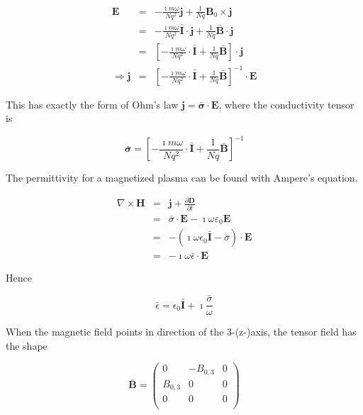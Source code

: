 \documentclass[a4paper,11pt]{thesis}
\begin{document}
\begin{eqnarray}
    \mathbf{E}&=& -\frac{\imath m \omega }{Nq^2}\mathbf{j} +\frac{1}{Nq} \mathbf{B}_0 \times \mathbf{j}\\
&=& -\frac{\imath m \omega }{Nq^2}  \bar{\mathbf{I}}\cdot \mathbf{j}+\frac{1}{Nq} \bar{\mathbf{B}} \cdot \mathbf{j}\nonumber \\
&=& \left[ -\frac{\imath m \omega }{Nq^2}  \cdot \bar{\mathbf{I}}+\frac{1}{Nq} \bar{\mathbf{B}} \right] \cdot \mathbf{j}\nonumber \\
\Rightarrow \mathbf{j} &=& \left[ -\frac{\imath m \omega }{Nq^2}\cdot \bar{\mathbf{I}}+\frac{1}{Nq} \bar{\mathbf{B}} \right]^{-1} \cdot \mathbf{E}
\end{eqnarray}

This has exactly the form of Ohm's law $\mathbf{j}= \mathbf{\bar{\sigma}} \cdot \mathbf{E}$, where the conductivity tensor is

\begin{equation}
    \mathbf{\bar{\sigma}} = \left[- \frac{\imath m \omega }{Nq^2}  \cdot \bar{\mathbf{I}}+\frac{1}{Nq} \bar{\mathbf{B}} \right]^{-1}
\end{equation}

The permittivity for a magnetized plasma can be found with Ampere's equation.

\begin{eqnarray}
\nabla \times \mathbf{H}&=&\mathbf{j}+ \frac{\partial \mathbf{D}}{\partial t}\\
&=&\bar{\sigma} \cdot \mathbf{E}- \imath \omega \varepsilon_0 \mathbf{E} \nonumber \\
&=&-(    \imath \omega \epsilon_0 \bar{\mathbf{I}} -\bar{\sigma})\cdot \mathbf{E} \nonumber \\
&=&-\imath \omega \bar{\epsilon} \cdot \mathbf{E} \nonumber
\end{eqnarray}


Hence

\begin{equation}
   \bar{ \epsilon}=\epsilon_0\bar{ \mathbf{I}}+\imath \frac{\bar{\sigma}}{\omega}
\end{equation}

When the magnetic field points in direction of the 3-(z-)axis, the tensor field has the shape

\begin{equation}
\bar{\mathbf{B}} =\left(%
\begin{array}{ccc}
  0 & -B_{0,3} & 0 \\
B_{0,3} & 0 & 0 \\
0 & 0 & 0 \\\end{array}%
\right)
\end{equation}
\end{document}
